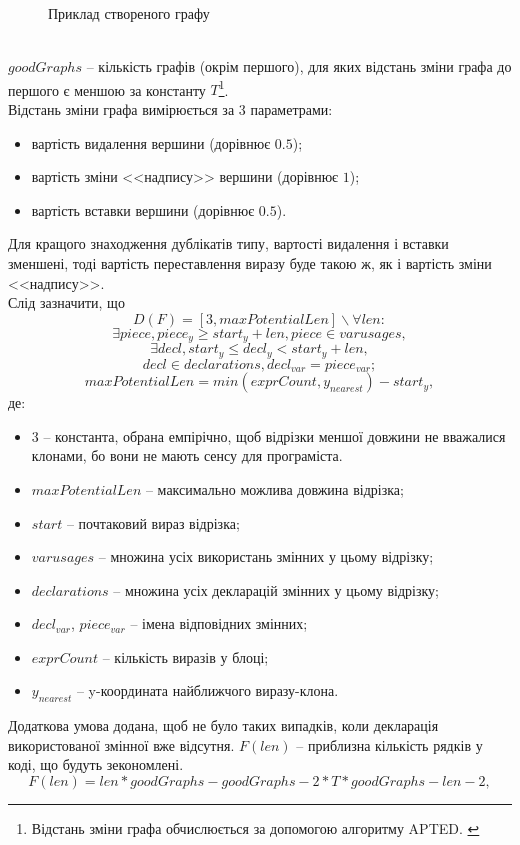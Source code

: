 \documentclass[a4paper, 14pt]{article}
\newcommand{\RNum}[1]{\uppercase\expandafter{\romannumeral #1\relax}}
\begin{document}
\begin{itemize}
{\begin{enumerate}
{\begin{figure}[h]
    \caption{Приклад створеного графу}
    \label{fig:}
\end{figure} \\
$goodGraphs$ -- кількість графів (окрім першого), для яких відстань зміни графа до першого є меншою за константу $T$\footnote{Відстань зміни графа обчислюється за допомогою алгоритму APTED. \cite{Pawlik15}\cite{Pawlik16}}. \\
Відстань зміни графа вимірюється за 3 параметрами: 
\begin{itemize}
\item вартість видалення вершини (дорівнює $0.5$);
\item вартість зміни <<надпису>> вершини (дорівнює $1$);
\item вартість вставки вершини (дорівнює $0.5$).
\end{itemize}
Для кращого знаходження дублікатів \RNum{3} типу, вартості видалення і вставки зменшені, 
тоді вартість переставлення виразу буде такою ж, як і вартість зміни <<надпису>>.\\
Слід зазначити, що $$D(F)=[3, maxPotentialLen] \backslash \forall len: $$
$$\exists piece, piece_y \geq start_y+len, piece \in varusages, $$
$$\exists decl, start_{y} \leq decl_{y} < start_{y}+len, $$
$$decl \in declarations, decl_{var}=piece_{var};$$
$$maxPotentialLen = min(exprCount, y_{nearest})-start_y,$$ де:
\begin{itemize} 
\item $3$ -- константа, обрана емпірічно, щоб відрізки меншої довжини не вважалися клонами, бо вони не мають сенсу для програміста.
\item $maxPotentialLen$ -- максимально можлива довжина відрізка;
\item $start$ -- почтаковий вираз відрізка;
\item $varusages$ -- множина усіх використань змінних у цьому відрізку;
\item $declarations$ -- множина усіх декларацій змінних у цьому відрізку;
\item $decl_{var}$, $piece_{var}$ -- імена відповідних змінних;
\item $exprCount$ -- кількість виразів у блоці;
\item $y_{nearest}$ -- y-координата найближчого виразу-клона.
\end{itemize}
Додаткова умова додана, щоб не було таких випадків, коли декларація використованої змінної вже відсутня.
$F(len)$ -- приблизна кількість рядків у коді, що будуть зекономлені.
$$F(len) = len*goodGraphs-goodGraphs-2*T*goodGraphs-len-2,$$ 
}
\end{enumerate}}
\end{itemize}
\end{document}
